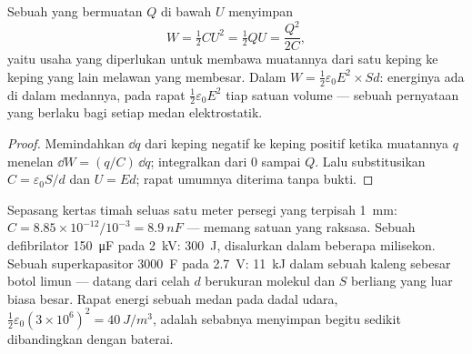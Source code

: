 \begin{theorem}\label{thm:b1:potential-capacitors:energy}
Sebuah  yang bermuatan $Q$ di bawah $U$ menyimpan
\[
W = \tfrac12 CU^2 = \tfrac12 QU = \frac{Q^2}{2C} ,
\]
yaitu usaha yang diperlukan untuk membawa muatannya dari satu keping ke
keping yang lain melawan  yang membesar. Dalam 
$W = \tfrac12\varepsilon_0E^2
\times Sd$: energinya ada di dalam medannya, pada rapat $\tfrac12\varepsilon_0E^2$
tiap satuan volume --- sebuah pernyataan yang berlaku bagi setiap medan
elektrostatik.
\end{theorem}

\begin{proof}
Memindahkan $\dd q$ dari keping negatif ke keping positif ketika muatannya
$q$ menelan $\dd W = (q/C)\,\dd q$; integralkan dari $0$ sampai $Q$. Lalu
substitusikan $C = \varepsilon_0S/d$ dan $U = Ed$; rapat umumnya diterima tanpa bukti.
\end{proof}

\begin{example}\label{ex:b1:potential-capacitors:energies}
Sepasang kertas timah seluas satu meter persegi yang terpisah \qty{1}{mm}: $C = 8.85 \times 10^{-12}/
10^{-3} = \qty{8.9}{nF}$ ---  memang satuan yang raksasa. Sebuah defibrilator
\qty{150}{\micro F} pada \qty{2}{kV}: \qty{300}{J}, disalurkan dalam beberapa milisekon.
Sebuah superkapasitor \qty{3000}{F} pada \qty{2.7}{V}: \qty{11}{kJ} dalam sebuah
kaleng sebesar botol limun ---  datang dari celah $d$ berukuran
molekul dan $S$ berliang yang luar biasa besar. Rapat energi sebuah medan pada
dadal udara, $\tfrac12\varepsilon_0(3 \times 10^6)^2 = \qty{40}{J/m^3}$, adalah
sebabnya  menyimpan begitu sedikit dibandingkan dengan baterai.
\end{example}

